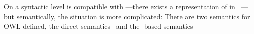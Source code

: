 On a syntactic level \owl is compatible with \rdf---there exists a representation of \owl in \rdf~\cite{owltordf}---but semantically, 
the situation is more complicated: There are two semantics for OWL defined, the direct semantics~\cite{owldsem} and the \rdf-based semantics~\cite{owlrdfsem}





% 
% 
% 



